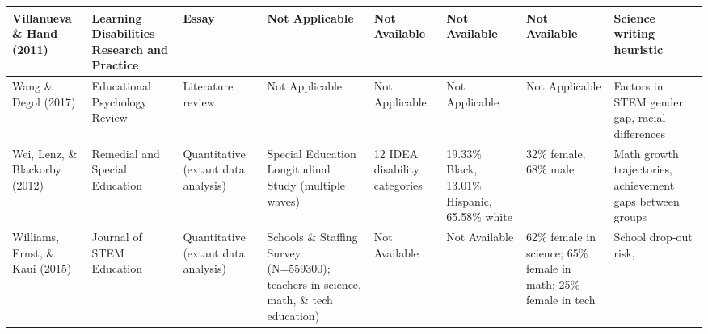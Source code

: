 \documentclass[11.5pt]{sig-alternate}
\begin{document}
\begin{@twocolumnfalse}
\begin{table}
\begin{tabular}{m{0.72in}m{0.72in}m{0.72in}m{0.72in}m{0.72in}m{0.72in}m{0.72in}m{0.72in}}
Villanueva \&  Hand (2011)                           & Learning Disabilities Research and Practice                     & Essay                                 &  \centering Not Applicable                                                                               &  \centering Not Available                                     &  \centering Not Available                                                                                          &  \centering Not Available                                                    & Science writing heuristic                                                                                \\ \hline
Wang \& Degol (2017)                                    & Educational Psychology Review                                   & Literature review                     &  \centering Not Applicable                                                                               &  \centering Not Applicable                                    &  \centering Not Applicable                                                                                         &  \centering Not Applicable                                                   & Factors in STEM gender gap, racial differences                                                           \\ \hline
Wei, Lenz, \& Blackorby (2012)                          & Remedial and Special Education                                  & Quantitative (extant data analysis)    & Special Education Longitudinal Study (multiple waves)                                        & 12 IDEA disability categories                     & 19.33\% Black, 13.01\% Hispanic, 65.58\% white                                                         & 32\% female, 68\% male                                           & Math growth trajectories, achievement gaps between groups                                                \\ \hline
Williams, Ernst, \&  Kaui (2015)                     & Journal of STEM Education                                       & Quantitative (extant data analysis)    & Schools \&  Staffing Survey (N=559300); teachers in science, math, \&  tech education) &  \centering Not Available                                     &  \centering Not Available                                                                                          & 62\% female in science; 65\% female in math; 25\% female in tech & School drop-out risk,                                                                                    \\ \hline

\end{tabular}
\end{table}
\end{@twocolumnfalse}
\end{document}
